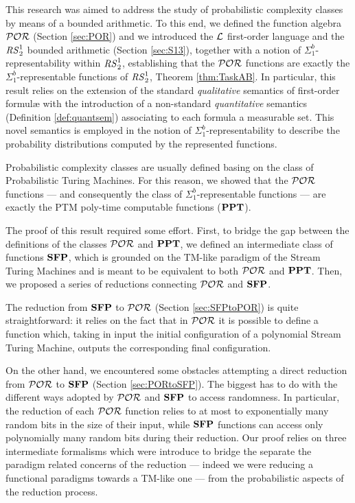 This research was aimed to address the study of probabilistic
complexity classes by means of a bounded arithmetic.
To this end, we defined the function algebra $\mathcal{POR}$ (Section \ref{sec:POR})
and we introduced the $\mathcal{L}$ first-order language and the ${\mathit{RS}^1_2}$
bounded arithmetic (Section \ref{sec:S13}),
together with a notion of $\Sigma^b_1$-representability within ${\mathit{RS}^1_2}$,
establishing that the $\mathcal{POR}$ functions are exactly the
$\Sigma^b_1$-representable functions of ${\mathit{RS}^1_2}$, Theorem \ref{thm:TaskAB}.
%
In particular, this result relies on the extension of the standard \emph{qualitative}
semantics of first-order formul\ae{} with the introduction of a
non-standard \emph{quantitative} semantics (Definition \ref{def:quantsem})
associating to each formula
a measurable set. This novel semantics is employed in the notion of
$\Sigma^b_1$-representability to describe the probability distributions
computed by the represented functions.


Probabilistic complexity classes are usually defined basing on
the class of Probabilistic Turing Machines. For this reason,
we showed that the $\mathcal{POR}$ functions --- and consequently the class of
$\Sigma^b_1$-representable functions --- are exactly the
PTM poly-time computable functions ($\mathbf{PPT}$).

The proof of this result required some effort. First, to bridge the gap
between the definitions of the classes $\mathcal{POR}$ and $\mathbf{PPT}$,
we defined an intermediate class of functions $\mathbf{SFP}$,
which is grounded on the TM-like paradigm of the Stream Turing Machines
and is meant to be equivalent to both $\mathcal{POR}$ and $\mathbf{PPT}$. Then, we proposed a series of reductions connecting $\mathcal{POR}$ and $\mathbf{SFP}$.

The reduction from $\mathbf{SFP}$ to $\mathcal{POR}$ (Section \ref{sec:SFPtoPOR}) is
quite straightforward: it relies on the fact that
in $\mathcal{POR}$ it is possible to define a function which,
taking in input the initial configuration
of a polynomial Stream Turing Machine,
outputs the corresponding final configuration.

On the other hand,
we encountered some obstacles attempting a
direct reduction from $\mathcal{POR}$ to $\mathbf{SFP}$  (Section \ref{sec:PORtoSFP}).
The biggest has to do with the different ways adopted by
$\mathcal{POR}$ and $\mathbf{SFP}$ to access randomness.
In particular, the reduction of each $\mathcal{POR}$ function
relies to at most to exponentially many
random bits in the size of their input,
while $\mathbf{SFP}$ functions can access only
polynomially many random bits during their reduction.
%
Our proof relies on three intermediate formalisms
which were introduce to bridge the separate the paradigm
related concerns of the reduction --- indeed we were
reducing a functional paradigms towards a TM-like one ---
from the probabilistic aspects of the reduction process.


